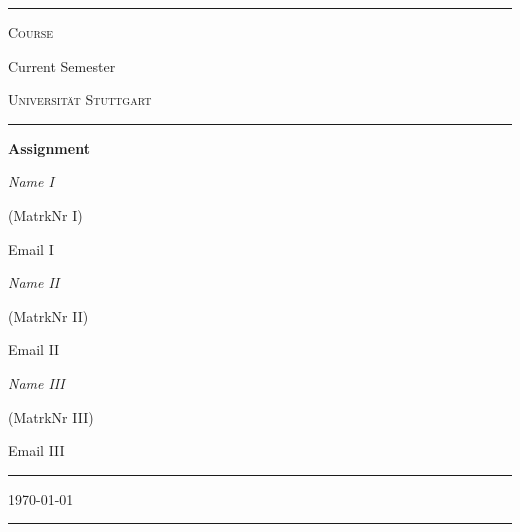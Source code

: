 \documentclass[12pt]{article} %
\newcounter{sheetnr}
\newcommand{\namei}{Name I} %
\newcommand{\matrknri}{MatrkNr I} %
\newcommand{\emaili}{Email I} %
\newcommand{\nameii}{Name II} %
\newcommand{\matrknrii}{MatrkNr II} %
\newcommand{\emailii}{Email II} %
\newcommand{\nameiii}{Name III} %
\newcommand{\matrknriii}{MatrkNr III} %
\newcommand{\emailiii}{Email III} %
\newcommand{\semester}{Current Semester}
\newcommand{\course}{Course}
\begin{document}


\begin{titlepage}
	\centering
	\rule{12cm}{1.0pt} %
	
	{\scshape\LARGE \course \par}
	
	\vspace{0.5cm} %
	
	{\Large \semester}
	
	\vspace{1.5cm} %
	
	{\scshape\Large Universität Stuttgart\par}
	
	\vspace{1.0cm} %
	
	\rule{8cm}{0.6pt} %
	
	{\huge\bfseries Assignment \thesheetnr \par}
	
	\vspace{2cm} %
	
	{\Large\itshape \namei} %
	{\Large (\matrknri)\par} %
	{\large \emaili \par} %
	
	\vspace{0.5cm} %
	
	{\Large\itshape \nameii} %
	{\Large (\matrknrii)\par} %
	{\large \emailii \par} %
	
	\vspace{0.5cm} %
	
	{\Large\itshape \nameiii} %
	{\Large (\matrknriii)\par} %
	{\large \emailiii \par} %
	
	\vspace{0.5cm} %
	
	\rule{8cm}{0.6pt} %
	
	\vspace{2cm} %
	
	{\Large \today\par} %
	
	\rule{12cm}{1.0pt} %
	
\end{titlepage}
\end{document}
